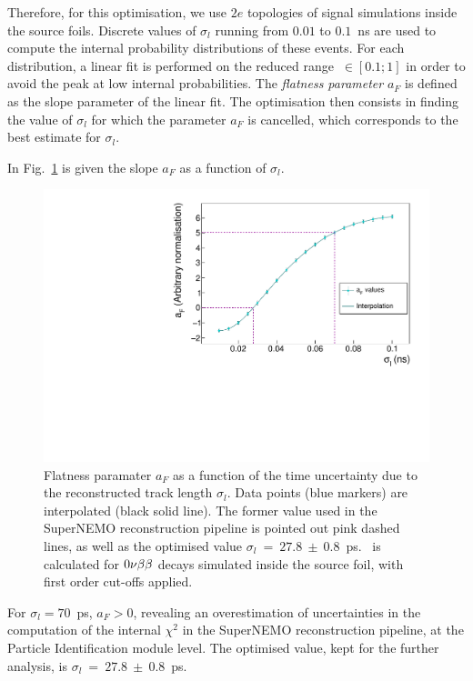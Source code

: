 Therefore, for this optimisation, we use $2e$ topologies of signal simulations inside the source foils.
Discrete values of $\sigma_{l}$ running from $0.01$ to $0.1$~ns are used to compute the internal probability distributions of these events.
For each distribution, a linear fit is performed on the reduced range \Pint$~\in[0.1;1]$ in order to avoid the peak at low internal probabilities.
The \emph{flatness parameter} $a_{F}$ is defined as the slope parameter of the linear fit.
The optimisation then consists in finding the value of $\sigma_{l}$ for which the parameter $a_{F}$ is cancelled, which corresponds to the best estimate for $\sigma_{l}$.

In Fig.~\ref{fig:flatness} is given the slope $a_{F}$ as a function of $\sigma_{l}$.
\begin{figure}[!h]
  \centering
  \includegraphics[width=13cm]{timedifference/fig_timediff/flatness.pdf}
  \caption{Flatness paramater $a_{F}$ as a function of the time uncertainty due to the reconstructed track length $\sigma_{l}$.
    Data points (blue markers) are interpolated (black solid line).
    The former value used in the SuperNEMO reconstruction pipeline is pointed out pink dashed lines, as well as the optimised value $\sigma_{l}~=~27.8~\pm~0.8$~ps.
    \Pint\ is calculated for $0\nu\beta\beta$ decays simulated inside the source foil, with first order cut-offs applied.
    \label{fig:flatness}}
\end{figure}
For $\sigma_{l}=70$~ps, $a_{F}>0$, revealing an overestimation of uncertainties in the computation of the internal $\chi^{2}$ in the SuperNEMO reconstruction pipeline, at the Particle Identification module level.
The optimised value, kept for the further analysis, is $\sigma_{l}~=~27.8~\pm~0.8$~ps.
